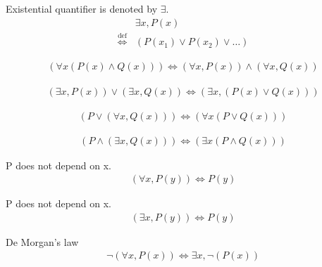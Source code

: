 \begin{defn}
Existential quantifier is denoted by $\exists$.
\begin{align*}
& \exists x, P(x) \\
\overset{\operatorname{def}}{\iff} & (P(x_1) \lor P(x_2) \lor \dots)
\end{align*}
\end{defn}

\begin{prop}
\label{Proposition:forall_land_commutativity}
\begin{align*}
(\forall x (P(x) \land Q(x))) \iff (\forall x, P(x)) \land (\forall x, Q(x))
\end{align*}
\end{prop}

\begin{prop}
\label{Proposition:exists_lor_commutativity}
\begin{align*}
(\exists x, P(x)) \lor (\exists x, Q(x)) \iff (\exists x, (P(x) \lor Q(x)))
\end{align*}
\end{prop}

\begin{prop}
\label{Proposition:lor_forall_distributivity}
\begin{align*}
(P \lor (\forall x, Q(x))) \iff (\forall x (P \lor Q(x)))
\end{align*}
\end{prop}

\begin{prop}
\label{Proposition:land_exists_distributivity}
\begin{align*}
(P \land (\exists x, Q(x))) \iff (\exists x (P \land Q(x)))
\end{align*}
\end{prop}

\begin{axm}
\label{Axiom:forall_independent_variable}
P does not depend on x.
\begin{align*}
(\forall x, P(y)) \iff P(y)
\end{align*}
\end{axm}

\begin{axm}
\label{Axiom:exists_independent_variable}
P does not depend on x.
\begin{align*}
(\exists x, P(y)) \iff P(y)
\end{align*}
\end{axm}

\begin{axm}
\label{Axiom:De_Morgan_1}
De Morgan's law
\begin{align*}
\lnot (\forall x, P(x)) \iff \exists x, \lnot (P(x))
\end{align*}
\end{axm}

